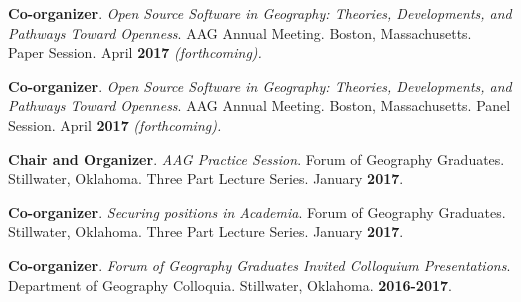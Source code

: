 \begin{cventries}
  \cventry
    {}
    {}
    {}
    {}
    {
       \begin{cvitems}
          \vspace{-3mm}
          \item {\textbf{Co-organizer}. \textit{Open Source Software in
                Geography: Theories, Developments, and Pathways Toward Openness}.
              AAG Annual Meeting. Boston, Massachusetts. Paper Session. April
              \textbf{2017} \textit{(forthcoming).}} 
          \end{cvitems}
          }
  \cventry
    {}
    {}
    {}
    {}
    {
       \begin{cvitems}
          \vspace{-3mm}
          \item {\textbf{Co-organizer}. \textit{Open Source Software in
                Geography: Theories, Developments, and Pathways Toward Openness}.
              AAG Annual Meeting. Boston, Massachusetts. Panel Session. April
              \textbf{2017} \textit{(forthcoming).}} 
          \end{cvitems}
          }
  \cventry
    {}
    {}
    {}
    {}
    {
       \begin{cvitems}
          \vspace{-3mm}
          \item {\textbf{Chair and Organizer}. \textit{AAG Practice Session}.
              Forum of Geography Graduates. Stillwater, Oklahoma. Three Part Lecture
              Series. January \textbf{2017}.} 
          \end{cvitems}
          }
  \cventry
    {}
    {}
    {}
    {}
    {
       \begin{cvitems}
          \vspace{-3mm}
          \item {\textbf{Co-organizer}. \textit{Securing positions in Academia}.
              Forum of Geography Graduates. Stillwater, Oklahoma. Three Part Lecture
              Series. January \textbf{2017}.} 
          \end{cvitems}
          }

  \cventry
    {}
    {}
    {}
    {}
    {
       \begin{cvitems}
          \vspace{-3mm}
        \item {\textbf{Co-organizer}. \textit{Forum of Geography Graduates Invited
              Colloquium Presentations}. Department of Geography Colloquia.
            Stillwater, Oklahoma. \textbf{2016-2017}.}
          \end{cvitems}
          }
\end{cventries}